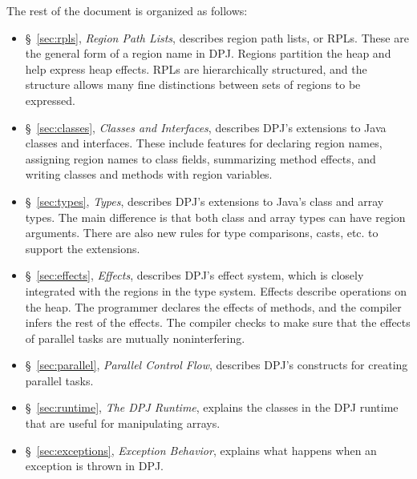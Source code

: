 The rest of the document is organized as follows:
%
\begin{itemize}
%
\item \S~\ref{sec:rpls}, \emph{Region Path Lists}, describes region
  path lists, or RPLs.  These are the general form of a region name in
  DPJ.  Regions partition the heap and help express heap effects.
  RPLs are hierarchically structured, and the structure allows many
  fine distinctions between sets of regions to be expressed.
%
\item \S~\ref{sec:classes}, \emph{Classes and Interfaces}, describes
  DPJ's extensions to Java classes and interfaces.  These include
  features for declaring region names, assigning region names to class
  fields, summarizing method effects, and writing classes and methods
  with region variables.
%
\item \S~\ref{sec:types}, \emph{Types}, describes DPJ's extensions to
  Java's class and array types.  The main difference is that both
  class and array types can have region arguments.  There are also new
  rules for type comparisons, casts, etc. to support the extensions.
%
\item \S~\ref{sec:effects}, \emph{Effects}, describes DPJ's effect
  system, which is closely integrated with the regions in the type
  system.  Effects describe operations on the heap.  The programmer
  declares the effects of methods, and the compiler infers the rest of
  the effects.  The compiler checks to make sure that the effects of
  parallel tasks are mutually noninterfering.
%
\item \S~\ref{sec:parallel}, \emph{Parallel Control Flow}, describes
  DPJ's constructs for creating parallel tasks.
%
\item \S~\ref{sec:runtime}, \emph{The DPJ Runtime}, explains the classes in
  the DPJ runtime that are useful for manipulating arrays.
%
\item \S~\ref{sec:exceptions}, \emph{Exception Behavior}, explains
  what happens when an exception is thrown in DPJ.
%
\end{itemize}


